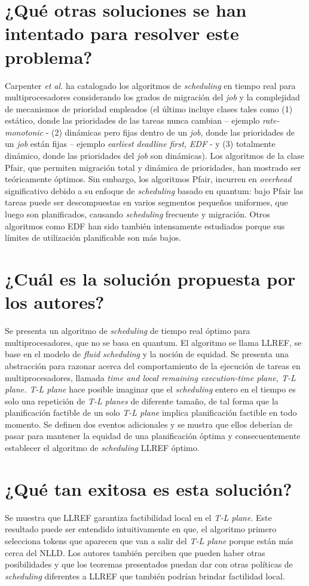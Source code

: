 \section{¿Qué otras soluciones se han intentado para resolver este problema?}
Carpenter \emph{et al.} ha catalogado los algoritmos de \emph{scheduling} en tiempo real para multiprocesadores considerando los grados de migración del \emph{job} y la complejidad de mecanismos de prioridad empleados (el último incluye clases tales como (1) estático, donde las prioridades de las tareas nunca cambian -- ejemplo \emph{rate-monotonic} - (2) dinámicas pero fijas dentro de un \emph{job}, donde las prioridades de un \emph{job} están fijas -- ejemplo \emph{earliest deadline first, EDF} - y (3) totalmente dinámico, donde las prioridades del \emph{job} son dinámicas). Los algoritmos de la clase Pfair, que permiten migración total y dinámica de prioridades, han mostrado ser teóricamente óptimos. Sin embargo, los algoritmos Pfair, incurren en \emph{overhead} significativo debido a su enfoque de \emph{scheduling} basado en quantum: bajo Pfair las tareas puede ser descompuestas en varios segmentos pequeños uniformes, que luego son planificados, causando \emph{scheduling} frecuente y migración. Otros algoritmos como EDF han sido también intensamente estudiados porque sus límites de utilización planificable son más bajos. 
     
\section{¿Cuál es la solución propuesta por los autores?}
Se presenta un algoritmo de \emph{scheduling} de tiempo real óptimo para multiprocesadores, que no se basa en quantum. El algoritmo se llama LLREF, se base en el modelo de \emph{fluid scheduling} y la noción de equidad. Se presenta una abstracción para razonar acerca del comportamiento de la ejecución de tareas en multiprocesadores, llamada \emph{time and local remaining execution-time plane, T-L plane. T-L plane} hace posible imaginar que el \emph{scheduling} entero en el tiempo es solo una repetición de \emph{T-L planes} de diferente tamaño, de tal forma que la planificación factible de un solo \emph{T-L plane} implica planificación factible en todo momento. Se definen dos eventos adicionales y se mustra que ellos deberían de pasar para mantener la equidad de una planificación óptima y consecuentemente establecer el algoritmo de \emph{scheduling} LLREF óptimo.

\section{¿Qué tan exitosa es esta solución?} 
Se muestra que LLREF garantiza factibilidad local en el \emph{T-L plane}. Este resultado puede ser entendido intuitivamente en que, el algoritmo primero selecciona tokens que aparecen que van a salir del \emph{T-L plane} porque están más cerca del NLLD. Los autores también perciben que pueden haber otras posibilidades y que los teoremas presentados puedan dar con otras políticas de \emph{scheduling} diferentes a LLREF que también podrían brindar factilidad local.